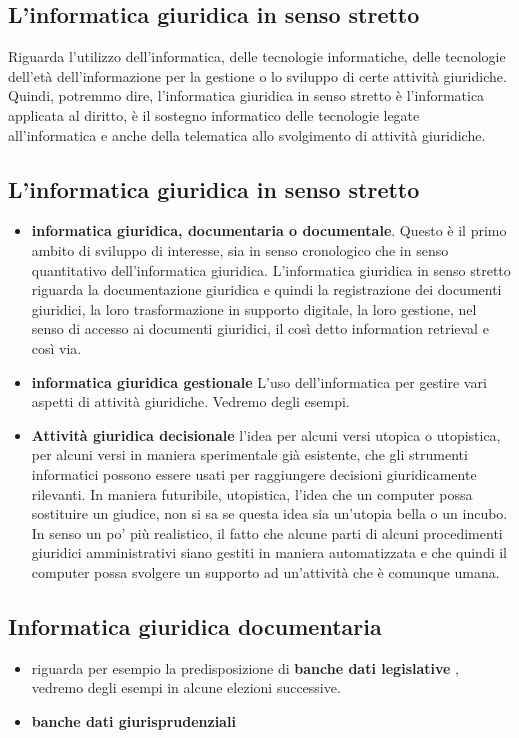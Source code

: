 \subsection{L'informatica giuridica in senso stretto} 
Riguarda l'utilizzo dell'informatica, delle tecnologie informatiche, delle tecnologie dell'età dell'informazione per la gestione o lo sviluppo di certe attività giuridiche. Quindi, potremmo dire, l'informatica giuridica in senso stretto è l'informatica applicata al diritto, è il sostegno informatico delle tecnologie legate all'informatica e anche della telematica allo svolgimento di attività giuridiche.


\subsection{L'informatica giuridica in senso stretto} 

\begin{itemize}
    \item \textbf{informatica giuridica, documentaria o documentale}. Questo è il primo ambito di sviluppo di interesse, sia in senso cronologico che in senso quantitativo dell'informatica giuridica. L'informatica giuridica in senso stretto riguarda la documentazione giuridica e quindi la registrazione dei documenti giuridici, la loro trasformazione in supporto digitale, la loro gestione, nel senso di accesso ai documenti giuridici, il così detto information retrieval e così via. 
    \item \textbf{informatica giuridica gestionale} L'uso dell'informatica per gestire vari aspetti di attività giuridiche. Vedremo degli esempi.
    \item \textbf{Attività giuridica decisionale} l'idea per alcuni versi utopica o utopistica, per alcuni versi in maniera sperimentale già esistente, che gli strumenti informatici possono essere usati per raggiungere decisioni giuridicamente rilevanti. In maniera futuribile, utopistica, l'idea che un computer possa sostituire un giudice, non si sa se questa idea sia un'utopia bella o un incubo. In senso un po' più realistico, il fatto che alcune parti di alcuni procedimenti giuridici amministrativi siano gestiti in maniera automatizzata e che quindi il computer possa svolgere un supporto ad un'attività che è comunque umana.
\end{itemize}

\subsection{Informatica giuridica documentaria}
\begin{itemize}
    \item riguarda per esempio la predisposizione di \textbf{banche dati legislative }, vedremo degli esempi in alcune elezioni successive.
    \item \textbf{banche dati giurisprudenziali} 
\end{itemize}

